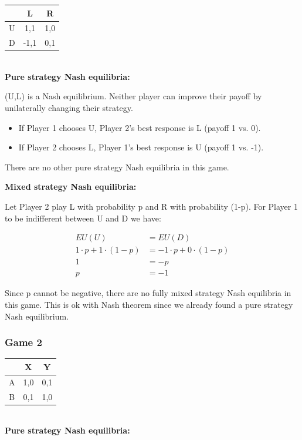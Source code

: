 \documentclass[10pt]{article}
\begin{document}
\begin{tabular}{c|c|c}
& L & R \\
\hline
U & 1,1 & 1,0 \\
\hline
D & -1,1 & 0,1 \\
\end{tabular}\\

\noindent
\textbf{Pure strategy Nash equilibria:}

(U,L) is a Nash equilibrium. Neither player can improve their payoff by unilaterally changing their strategy.

\begin{itemize}
\item If Player 1 chooses U, Player 2's best response is L (payoff 1 vs. 0).
\item If Player 2 chooses L, Player 1's best response is U (payoff 1 vs. -1).
\end{itemize}

There are no other pure strategy Nash equilibria in this game.

\noindent
\textbf{Mixed strategy Nash equilibria:}

Let Player 2 play L with probability p and R with probability (1-p). For Player 1 to be indifferent between U and D we have:

\begin{align*}
EU(U) &= EU(D) \\
1 \cdot p + 1 \cdot (1-p) &= -1 \cdot p + 0 \cdot (1-p) \\
1 &= -p \\
p &= -1
\end{align*}

Since p cannot be negative, there are no fully mixed strategy Nash equilibria in this game. This is ok with Nash theorem since we already found a pure strategy Nash equilibrium.

\subsubsection*{Game 2}

\begin{tabular}{c|c|c}
& X & Y \\
\hline
A & 1,0 & 0,1 \\
\hline
B & 0,1 & 1,0 \\
\end{tabular}\\

\noindent
\textbf{Pure strategy Nash equilibria:}
\end{document}
